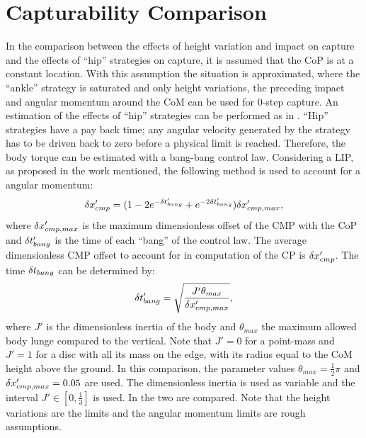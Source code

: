 \section{Capturability Comparison}
In the comparison between the effects of height variation and impact on capture and the effects of ``hip'' strategies on capture, it is assumed that the \ac{CoP} is at a constant location. With this assumption the situation is approximated, where the ``ankle'' strategy is saturated and only height variations, the preceding impact and angular momentum around the \ac{CoM} can be used for 0-step capture.
\paraskip
An estimation of the effects of ``hip'' strategies can be performed as in \cite{pratt2006capture, koolen2012capturability}. ``Hip'' strategies have a pay back time; any angular velocity generated by the strategy has to be driven back to zero before a physical limit is reached. Therefore, the body torque can be estimated with a bang-bang control law.  Considering a \ac{LIP}, as proposed in the work mentioned, the following method is used to account for a angular momentum:
\begin{equation}
\delta x_{cmp}' = (1-2e^{-\delta t_{bang}'}+e^{-2\delta t_{bang}'})\delta x_{cmp,max}',
\end{equation}
where $\delta x_{cmp,max}'$ is the maximum dimensionless offset of the \ac{CMP} with the \ac{CoP} and $\delta t_{bang}'$ is the time of each ``bang'' of the control law. The average dimensionless \ac{CMP} offset to account for in computation of the \ac{CP} is $\delta x_{cmp}'$. The time $\delta t_{bang}$ can be determined by:
\begin{equation}
\delta t_{bang}' = \sqrt{\frac{J'\theta_{max}}{\delta x_{cmp,max}'}},
\end{equation}
where $J'$ is the dimensionless inertia of the body and $\theta_{max}$ the maximum allowed body lunge compared to the vertical. Note that $J'=0$ for a point-mass and $J'=1$ for a disc with all its mass on the edge, with its radius equal to the \ac{CoM} height above the ground. In this comparison, the parameter values $\theta_{max} = \frac{1}{2}\pi$ and $\delta x_{cmp,max}' = 0.05$ are used. The dimensionless inertia is used as variable and the interval $J' \in [0,\frac{1}{3}]$ is used.  
\paraskip
In  the two are compared. Note that the height variations are the limits and the angular momentum limits are rough assumptions.

